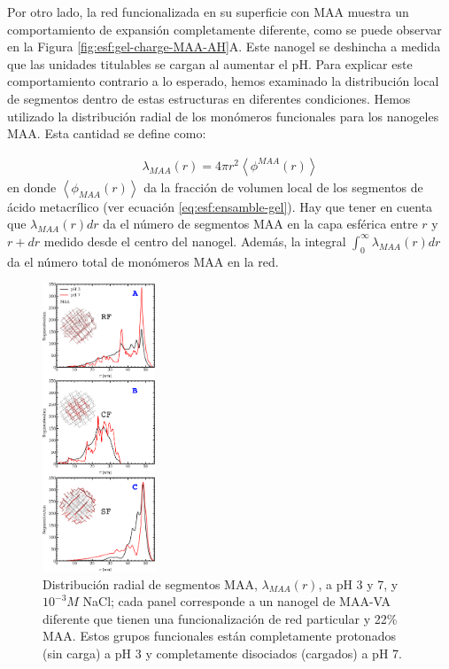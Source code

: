 Por otro lado, la red funcionalizada en su superficie con MAA muestra un comportamiento de expansi\'on completamente diferente, como se puede observar en la Figura \ref{fig:esf:gel-charge-MAA-AH}A. Este nanogel se deshincha a medida que las unidades titulables se cargan al aumentar el pH. Para explicar este comportamiento contrario a lo esperado, hemos examinado la distribuci\'on local de segmentos dentro de estas estructuras en diferentes condiciones. Hemos utilizado la distribuci\'on radial de los mon\'omeros funcionales para los nanogeles MAA. Esta cantidad se define como:



%
\begin{align}
    \lambda_{MAA}(r)= 4\pi r^2\left<\phi^{MAA}(r)\right>
\end{align}
%
\noindent en donde $\left<\phi_{MAA}(r)\right>$ da la fracci\'on de volumen local de los segmentos de \'acido metacr\'ilico (ver ecuaci\'on \ref{eq:esf:ensamble-gel}).
Hay que tener en cuenta que $\lambda_{MAA}(r) dr$ da el n\'umero de segmentos MAA en la capa esf\'erica entre $r$ y $r+dr$ medido desde el centro del nanogel.
Adem\'as, la integral $\int_0^\infty \lambda_{MAA}(r) dr$ da el n\'umero total de mon\'omeros MAA en la red.


\begin{figure}[!htb]
     \centering
     \includegraphics[width=0.30\textwidth]{Figures/graphs-gel2/dist-MAA.pdf}
     \caption{Distribuci\'on radial de segmentos MAA, $\lambda_{MAA}(r)$, a pH 3 y 7, y $10^{-3}M$ NaCl; cada panel corresponde a un nanogel de  MAA-VA diferente que tienen una funcionalizaci\'on de red particular y 22\% MAA.
     	Estos grupos funcionales est\'an completamente protonados (sin carga) a pH 3 y completamente disociados (cargados) a pH 7.}
     \label{fig:esf:MAA-vs-r-distribution}
 \end{figure}

